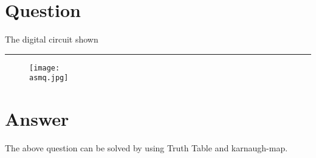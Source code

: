 \documentclass[journal,12pt,twocolumn]{IEEEtran}
\title{\ktitle}
\author{\kauthor\\\kcontact\\\kmodule}
\begin{document}
\maketitle
\tableofcontents
\section{\textbf{Question}}
 The digital circuit shown \rule{9mm}{0.4pt}
\begin{figure}[ht]
    \centering
    \texttt{[image: \\asmq.jpg]}
    \label{fig:enter-label}
\end{figure}
\section{\textbf{Answer}}
The above question can be solved by using Truth Table and karnaugh-map.
\end{document}
